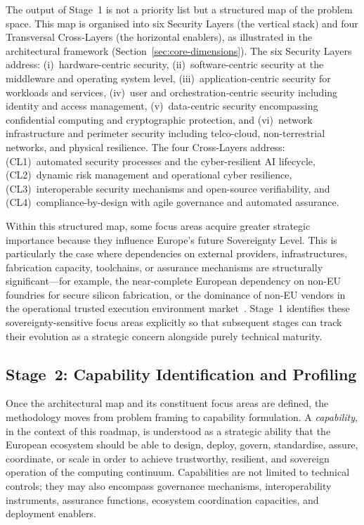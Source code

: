 The output of Stage~1 is not a priority list but a structured map of the problem space. This map is organised into six Security Layers (the vertical stack) and four Transversal Cross-Layers (the horizontal enablers), as illustrated in the architectural framework (Section~\ref{sec:core-dimensions}). The six Security Layers address: (i)~hardware-centric security, (ii)~software-centric security at the middleware and operating system level, (iii)~application-centric security for workloads and services, (iv)~user and orchestration-centric security including identity and access management, (v)~data-centric security encompassing confidential computing and cryptographic protection, and (vi)~network infrastructure and perimeter security including telco-cloud, non-terrestrial networks, and physical resilience. The four Cross-Layers address: (CL1)~automated security processes and the cyber-resilient AI lifecycle, (CL2)~dynamic risk management and operational cyber resilience, (CL3)~interoperable security mechanisms and open-source verifiability, and (CL4)~compliance-by-design with agile governance and automated assurance.

Within this structured map, some focus areas acquire greater strategic importance because they influence Europe's future Sovereignty Level. This is particularly the case where dependencies on external providers, infrastructures, fabrication capacity, toolchains, or assurance mechanisms are structurally significant---for example, the near-complete European dependency on non-EU foundries for secure silicon fabrication, or the dominance of non-EU vendors in the operational trusted execution environment market~\cite{cloud_edge_roadmap}. Stage~1 identifies these sovereignty-sensitive focus areas explicitly so that subsequent stages can track their evolution as a strategic concern alongside purely technical maturity.


\subsection{Stage~2: Capability Identification and Profiling}
\label{sec:meth-stage2}

Once the architectural map and its constituent focus areas are defined, the methodology moves from problem framing to capability formulation. A \textit{capability}, in the context of this roadmap, is understood as a strategic ability that the European ecosystem should be able to design, deploy, govern, standardise, assure, coordinate, or scale in order to achieve trustworthy, resilient, and sovereign operation of the computing continuum. Capabilities are not limited to technical controls; they may also encompass governance mechanisms, interoperability instruments, assurance functions, ecosystem coordination capacities, and deployment enablers.

